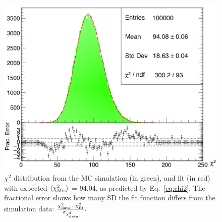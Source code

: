 \documentclass[a4paper,11pt]{article}
\begin{document}
\vspace{-0.1cm}
\begin{figure}[!ht]
	\centering
	\includegraphics[scale = 0.26]{fig/chi2.png}
	\vspace{-0.1cm}
	\caption{$\chi^2$ distribution from the MC simulation (in green), and fit (in red) with expected $\langle \chi^2_{\rm{Mis}} \rangle$ = 94.04, as predicted by Eq.~\ref{eq:chi2}. The fractional error shows how many SD the fit function differs from the simulation data: $\frac{\chi^2_{\rm{data}}-\chi^2_{\rm{fit}}}{\sigma_{\chi^2_{\rm{data}}}}.$} \label{fig:chi2}
\end{figure}
\vspace{-0.35cm} 
\end{document}
